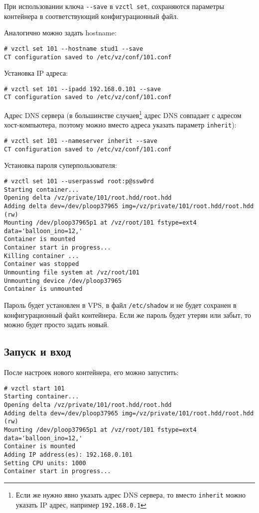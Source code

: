 При использовании ключа \texttt{-{}-save} в \texttt{vzctl set}, сохраняются параметры контейнера в соответствующий конфигурационный файл.

Аналогично можно задать hostname:
\begin{lstlisting}
# vzctl set 101 --hostname stud1 --save
CT configuration saved to /etc/vz/conf/101.conf
\end{lstlisting}

Установка IP адреса:
\begin{lstlisting}
# vzctl set 101 --ipadd 192.168.0.101 --save
CT configuration saved to /etc/vz/conf/101.conf
\end{lstlisting}

Адрес DNS сервера (в большинстве случаев\footnote{Если же нужно явно указать адрес DNS сервера, то вместо \texttt{inherit} можно указать IP адрес, например \texttt{192.168.0.1}} адрес DNS совпадает с адресом хост-компьютера, поэтому можно вместо адреса указать параметр \texttt{inherit}):
\begin{lstlisting}
# vzctl set 101 --nameserver inherit --save
CT configuration saved to /etc/vz/conf/101.conf
\end{lstlisting}

Установка пароля суперпользователя:
\begin{lstlisting}
# vzctl set 101 --userpasswd root:p@ssw0rd
Starting container...
Opening delta /vz/private/101/root.hdd/root.hdd
Adding delta dev=/dev/ploop37965 img=/vz/private/101/root.hdd/root.hdd (rw)
Mounting /dev/ploop37965p1 at /vz/root/101 fstype=ext4 data='balloon_ino=12,' 
Container is mounted
Container start in progress...
Killing container ...
Container was stopped
Unmounting file system at /vz/root/101
Unmounting device /dev/ploop37965
Container is unmounted
\end{lstlisting}

Пароль будет установлен в VPS, в файл \texttt{/etc/shadow} и не будет сохранен в конфигурационный файл контейнера.
Если же пароль будет утерян или забыт, то можно будет просто задать новый.

\subsection{Запуск и вход}
После настроек нового контейнера, его можно запустить:
\begin{lstlisting}
# vzctl start 101
Starting container...
Opening delta /vz/private/101/root.hdd/root.hdd
Adding delta dev=/dev/ploop37965 img=/vz/private/101/root.hdd/root.hdd (rw)
Mounting /dev/ploop37965p1 at /vz/root/101 fstype=ext4 data='balloon_ino=12,' 
Container is mounted
Adding IP address(es): 192.168.0.101
Setting CPU units: 1000
Container start in progress...
\end{lstlisting}

